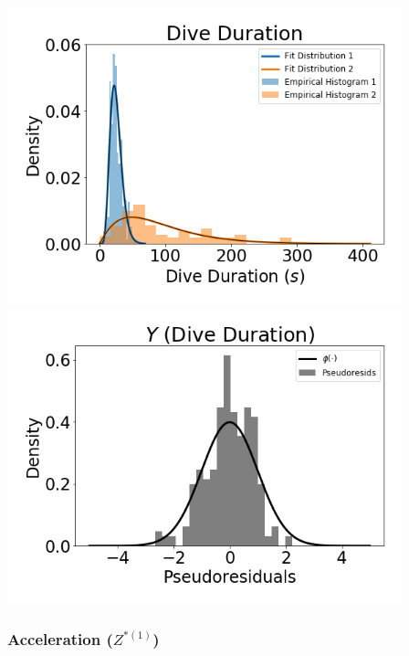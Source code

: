 \documentclass[12pt]{TD-CJS}
\begin{document}
\includegraphics[width=4.5in]{../Plots/HHMM_empirical_hist_dive_duration.png}
\includegraphics[width=4.5in]{../Plots/HHMM_psedoresids_Dive_Duration.png}

\newpage
\subsubsection{Acceleration ($Z^{*(1)}$)}
\end{document}
